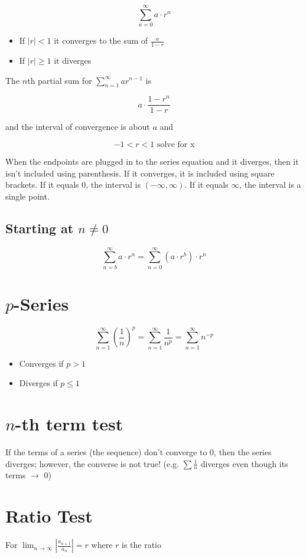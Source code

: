 \documentclass[12pt]{article}
\begin{document}
$$\sum_{n=0}^\infty a \cdot r^n$$

\begin{itemize}
    \item If $|r| < 1$ it converges to the sum of $\frac{a}{1-r}$
    \item If $|r| \geq 1$  it diverges
\end{itemize}

\noindent The $n$th partial sum for $\sum_{n=1}^\infty ar^{n-1} $ is 

$$a \cdot \frac{1-r^n}{1-r}$$

\noindent and the interval of convergence is about $a$ and

$$-1 < r < 1 \text{ solve for x}$$

\noindent When the endpoints are plugged in to the series equation and it diverges, then it isn't included using parenthesis. If it converges, it is included using square brackets. If it equals $0$, the interval is $(-\infty,\infty)$. If it equals $\infty$, the interval is a single point.


\subsection{Starting at $n \neq 0$}
$$\sum_{n=b}^\infty a \cdot r^n = \sum_{n=0}^\infty (a\cdot r^b) \cdot r^n$$

\section{$p$-Series}
$$ \sum_{n=1}^\infty \left(\frac{1}{n}\right)^p=
\sum_{n=1}^\infty \frac{1}{n^p} = 
\sum_{n=1}^\infty n^{-p}$$

\begin{itemize}
    \item Converges if $p>1$
    \item Diverges if $p \leq 1$
\end{itemize}

\section{$n$-th term test}
If the terms of a series (the sequence) don't converge to $0$, then the series diverges; however, the converse is not true! (e.g. $\sum \frac{1}{n}$ diverges even though its terms $\to$ 0)

\section{Ratio Test} 
For $\lim_{n\to\infty} \left| \frac{a_{n+1}}{a_n} \right| = r$ where $r$ is the ratio
\end{document}
